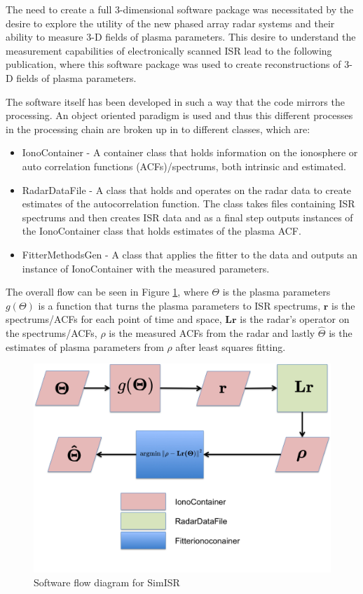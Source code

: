 The need to create a full 3-dimensional software package was necessitated by the desire to explore the utility of the new phased array radar systems and their ability to measure 3-D fields of plasma parameters. This desire to understand the measurement capabilities of electronically scanned ISR lead to the following publication, \citet{RDS:RDS20236} where this software package was used to create reconstructions of 3-D fields of plasma parameters.

The software itself has been developed in such a way that the code mirrors the processing. An object oriented paradigm is used and thus this different processes in the processing chain are broken up in to different classes, which are: 

\begin{itemize} 
\item IonoContainer - A container class that holds information on the ionosphere or auto correlation functions (ACFs)/spectrums, both intrinsic and estimated.

\item RadarDataFile - A class that holds and operates on the radar data to create estimates of the autocorrelation function. The class takes files containing ISR spectrums and then creates ISR data and as a final step outputs instances of the IonoContainer class that holds estimates of the plasma ACF.

\item FitterMethodsGen - A class that applies the fitter to the data and outputs an instance of IonoContainer with the measured parameters. 
\end{itemize}

The overall flow can be seen in Figure \ref{fig:swflow}, where  $\Theta$ is the plasma parameters $ g(\Theta)$ is a function that turns the plasma parameters to ISR spectrums, $ \mathbf{r}$ is the spectrums/ACFs for each point of time and space, $ \mathbf{Lr}$ is the radar's operator on the spectrums/ACFs, $ \rho$ is the measured ACFs from the radar and lastly $ \hat{\Theta}$ is the estimates of plasma parameters from $ \rho$ after least squares fitting.

\begin{figure}[h!]
\centering
\includegraphics[width=5.0in]{softwareflowandmath}
\caption{Software flow diagram for SimISR}
\label{fig:swflow}
\end{figure}


